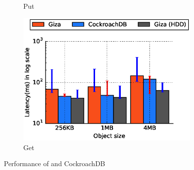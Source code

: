 \begin{figure}[t]
\begin{subfigure}{0.45\textwidth}
      \caption{Put}
      \label{fig:eval_cock_put}
    \end{subfigure}
%
    \begin{subfigure}{0.45\textwidth}
      \includegraphics[width=\linewidth]{plots/giza_cock_get}

      \caption{Get}
      \label{fig:eval_cock_get}
    \end{subfigure}
  \caption{Performance of \name and CockroachDB}
\end{figure}

